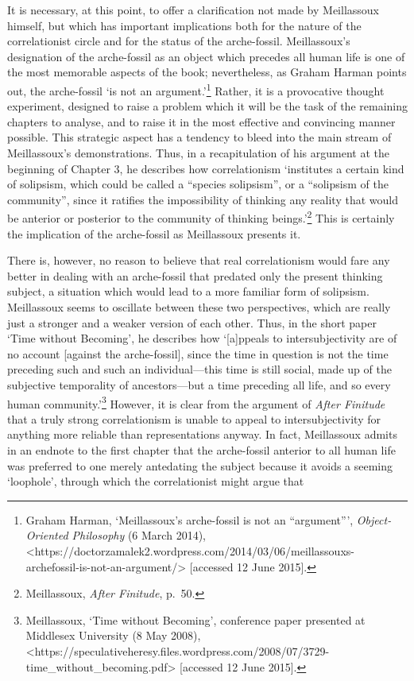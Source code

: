 \documentclass[]{article}
\begin{document}
It is necessary, at this point, to offer a clarification not made by
Meillassoux himself, but which has important implications both for the
nature of the correlationist circle and for the status of the
arche-fossil. Meillassoux’s designation of the arche-fossil as an object
which precedes all human life is one of the most memorable aspects of
the book; nevertheless, as Graham Harman points out, the arche-fossil
‘is not an argument.’\footnote{Graham Harman, ‘Meillassoux’s
  arche-fossil is not an “argument”’, \emph{Object-Oriented Philosophy}
  (6 March 2014),
  \textless{}https://doctorzamalek2.wordpress.com/2014/03/06/meillassouxs-archefossil-is-not-an-argument/\textgreater{}
  {[}accessed 12 June 2015{]}.} Rather, it is a provocative thought
experiment, designed to raise a problem which it will be the task of the
remaining chapters to analyse, and to raise it in the most effective and
convincing manner possible. This strategic aspect has a tendency to
bleed into the main stream of Meillassoux’s demonstrations. Thus, in a
recapitulation of his argument at the beginning of Chapter 3, he
describes how correlationism ‘institutes a certain kind of solipsism,
which could be called a “species solipsism”, or a “solipsism of the
community”, since it ratifies the impossibility of thinking any reality
that would be anterior or posterior to the community of thinking
beings.’\footnote{Meillassoux, \emph{After Finitude}, p.~50.} This is
certainly the implication of the arche-fossil as Meillassoux presents
it.

There is, however, no reason to believe that real correlationism would
fare any better in dealing with an arche-fossil that predated only the
present thinking subject, a situation which would lead to a more
familiar form of solipsism. Meillassoux seems to oscillate between these
two perspectives, which are really just a stronger and a weaker version
of each other. Thus, in the short paper ‘Time without Becoming’, he
describes how ‘{[}a{]}ppeals to intersubjectivity are of no account
{[}against the arche-fossil{]}, since the time in question is not the
time preceding such and such an individual—this time is still social,
made up of the subjective temporality of ancestors—but a time preceding
all life, and so every human community.’\footnote{Meillassoux, ‘Time
  without Becoming’, conference paper presented at Middlesex University
  (8 May 2008),
  \textless{}https://speculativeheresy.files.wordpress.com/2008/07/3729-time\_without\_becoming.pdf\textgreater{}
  {[}accessed 12 June 2015{]}.} However, it is clear from the argument
of \emph{After Finitude} that a truly strong correlationism is unable to
appeal to intersubjectivity for anything more reliable than
representations anyway. In fact, Meillassoux admits in an endnote to the
first chapter that the arche-fossil anterior to all human life was
preferred to one merely antedating the subject because it avoids a
seeming ‘loophole’, through which the correlationist might argue that
\end{document}
